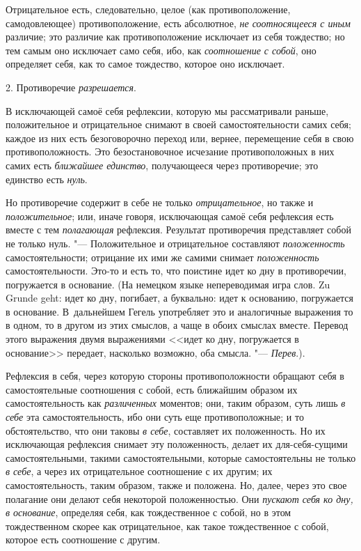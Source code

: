Отрицательное есть, следовательно, целое (как противоположение,
самодовлеющее) противоположение, есть абсолютное,
{\em не соотносящееся с иным} различие; это различие
как противоположение исключает из себя тождество; но тем самым оно
исключает само себя, ибо, как {\em соотношение с
собой}, оно определяет себя, как то самое тождество, которое оно исключает.


\bigskip

2. Противоречие {\em разрешается}.

В исключающей самоё себя рефлексии, которую мы рассматривали раньше,
положительное и отрицательное снимают в своей самостоятельности самих себя;
каждое из них есть безоговорочно переход или, вернее, перемещение себя в
свою противоположность. Это безостановочное исчезание противоположных в них
самих есть {\em ближайшее единство}, получающееся через
противоречие; это единство есть {\em нуль}.

Но противоречие содержит в себе не только {\em отрицательное}, но также и
{\em положительное}; или, иначе говоря, исключающая
самоё себя рефлексия есть вместе с тем {\em полагающая}
рефлексия. Результат противоречия представляет собой не только нуль. "---
Положительное и отрицательное составляют
{\em положенность} самостоятельности; отрицание их ими
же самими снимает {\em положенность} самостоятельности.
Это-то и есть то, что поистине идет ко дну в противоречии, погружается в
основание. (На немецком языке непереводимая игра слов. Zu Grunde geht: идет
ко дну, погибает, а буквально: идет к основанию, погружается в основание.
В~дальнейшем Гегель употребляет это и аналогичные выражения то в одном, то в
другом из этих смыслов, а чаще в обоих смыслах вместе. Перевод этого
выражения двумя выражениями <<идет ко дну, погружается в основание>>
передает, насколько возможно, оба смысла. "---
{\em Перев}.).

Рефлексия в себя, через которую стороны противоположности обращают себя в
самостоятельные соотношения с собой, есть ближайшим образом их
самостоятельность как {\em различенных} моментов; они,
таким образом, суть лишь {\em в себе} эта
самостоятельность, ибо они суть еще противоположные; и то обстоятельство,
что они таковы {\em в себе}, составляет их
положенность. Но их исключающая рефлексия снимает эту положенность, делает
их для-себя-сущими самостоятельными, такими самостоятельными, которые
самостоятельны не только {\em в себе}, а через их
отрицательное соотношение с их другим; их самостоятельность, таким образом,
также и положена. Но, далее, через это свое полагание они делают себя
некоторой положенностью. Они {\em пускают себя ко дну,
в основание}, определяя себя, как тождественное с собой, но в этом
тождественном скорее как отрицательное, как такое тождественное с собой,
которое есть соотношение с другим.

